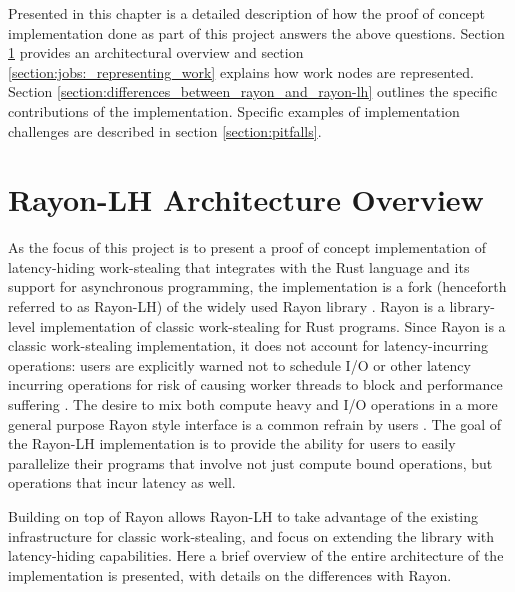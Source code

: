 \documentclass[bsc,frontabs,singlespacing,parskip,deptreport,normalheadings]{infthesis}
\begin{document}
Presented in this chapter is a detailed description of how the proof of concept
implementation done as part of this project answers the above questions. Section
\ref{section:rayon-lh_architecture_overview} provides an architectural overview
and section \ref{section:jobs:_representing_work} explains how work nodes are
represented. Section \ref{section:differences_between_rayon_and_rayon-lh}
outlines the specific contributions of the implementation. Specific examples of
implementation challenges are described in section \ref{section:pitfalls}.

\section{Rayon-LH Architecture Overview}
\label{section:rayon-lh_architecture_overview}

As the focus of this project is to present a proof of concept implementation of
latency-hiding work-stealing that integrates with the Rust language and its
support for asynchronous programming, the implementation is a fork (henceforth
referred to as Rayon-LH) \cite{weidinger_rayon-lh_2021} of the widely used Rayon
library \cite{noauthor_rayon_2022, noauthor_baby_nodate, stone_how_2021}. Rayon
is a library-level implementation of classic work-stealing for Rust programs.
Since Rayon is a classic work-stealing implementation, it does not account for
latency-incurring operations: users are explicitly warned not to schedule I/O or
other latency incurring operations for risk of causing worker threads to block
and performance suffering \cite{noauthor_rayon_nodate}. The desire to mix both
compute heavy and I/O operations in a more general purpose Rayon style interface
is a common refrain by users \cite{noauthor_does_nodate, rodyamirov_how_2020}.
The goal of the Rayon-LH implementation is to provide the ability for users to
easily parallelize their programs that involve not just compute bound
operations, but operations that incur latency as well.

Building on top of Rayon allows Rayon-LH to take advantage of the existing
infrastructure for classic work-stealing, and focus on extending the library
with latency-hiding capabilities. Here a brief overview of the entire
architecture of the implementation is presented, with details on the differences
with Rayon.
\end{document}
